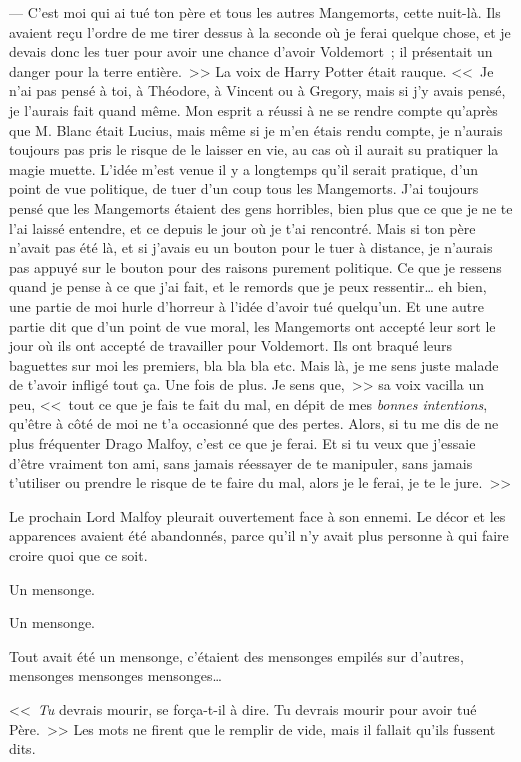 --- C'est moi qui ai tué ton père et tous les autres Mangemorts, cette nuit-là. Ils avaient reçu l'ordre de me tirer dessus à la seconde où je ferai quelque chose, et je devais donc les tuer pour avoir une chance d'avoir Voldemort~; il présentait un danger pour la terre entière.~>> La voix de Harry Potter était rauque. <<~Je n'ai pas pensé à toi, à Théodore, à Vincent ou à Gregory, mais si j'y avais pensé, je l'aurais fait quand même. Mon esprit a réussi à ne se rendre compte qu'après que M. Blanc était Lucius, mais même si je m'en étais rendu compte, je n'aurais toujours pas pris le risque de le laisser en vie, au cas où il aurait su pratiquer la magie muette. L'idée m'est venue il y a longtemps qu'il serait pratique, d'un point de vue politique, de tuer d'un coup tous les Mangemorts. J'ai toujours pensé que les Mangemorts étaient des gens horribles, bien plus que ce que je ne te l'ai laissé entendre, et ce depuis le jour où je t'ai rencontré. Mais si ton père n'avait pas été là, et si j'avais eu un bouton pour le tuer à distance, je n'aurais pas appuyé sur le bouton pour des raisons purement politique. Ce que je ressens quand je pense à ce que j'ai fait, et le remords que je peux ressentir… eh bien, une partie de moi hurle d'horreur à l'idée d'avoir tué quelqu'un. Et une autre partie dit que d'un point de vue moral, les Mangemorts ont accepté leur sort le jour où ils ont accepté de travailler pour Voldemort. Ils ont braqué leurs baguettes sur moi les premiers, bla bla bla etc. Mais là, je me sens juste malade de t'avoir infligé tout ça. Une fois de plus. Je sens que,~>> sa voix vacilla un peu, <<~tout ce que je fais te fait du mal, en dépit de mes \emph{bonnes intentions}, qu'être à côté de moi ne t'a occasionné que des pertes. Alors, si tu me dis de ne plus fréquenter Drago Malfoy, c'est ce que je ferai. Et si tu veux que j'essaie d'être vraiment ton ami, sans jamais réessayer de te manipuler, sans jamais t'utiliser ou prendre le risque de te faire du mal, alors je le ferai, je te le jure.~>>

Le prochain Lord Malfoy pleurait ouvertement face à son ennemi. Le décor et les apparences avaient été abandonnés, parce qu'il n'y avait plus personne à qui faire croire quoi que ce soit.

Un mensonge.

Un mensonge.

Tout avait été un mensonge, c'étaient des mensonges empilés sur d'autres, mensonges mensonges mensonges…

<<~\emph{Tu} devrais mourir, se força-t-il à dire. Tu devrais mourir pour avoir tué Père.~>> Les mots ne firent que le remplir de vide, mais il fallait qu'ils fussent dits.

